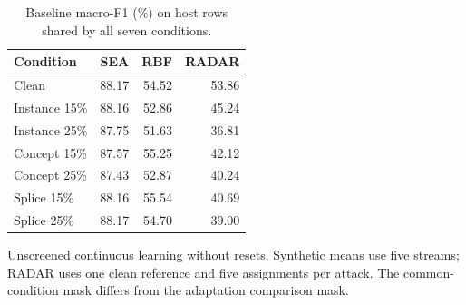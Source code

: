 \begin{table}[htbp]
\centering\small\singlespacing
\caption{Baseline macro-F1 (\%) on host rows shared by all seven conditions.}\label{tab:baseline}
\setlength{\tabcolsep}{4pt}
\renewcommand{\arraystretch}{1.18}
\begin{tabular}{@{}lrrr@{}}
\toprule
Condition & SEA & RBF & RADAR \\
\midrule
Clean & 88.17 & 54.52 & 53.86 \\
Instance 15\% & 88.16 & 52.86 & 45.24 \\
Instance 25\% & 87.75 & 51.63 & 36.81 \\
Concept 15\% & 87.57 & 55.25 & 42.12 \\
Concept 25\% & 87.43 & 52.87 & 40.24 \\
Splice 15\% & 88.16 & 55.54 & 40.69 \\
Splice 25\% & 88.17 & 54.70 & 39.00 \\
\bottomrule
\end{tabular}
\par\smallskip\begin{minipage}{\textwidth}\footnotesize Unscreened continuous learning without resets. Synthetic means use five streams; RADAR uses one clean reference and five assignments per attack. The common-condition mask differs from the adaptation comparison mask.\end{minipage}
\end{table}
